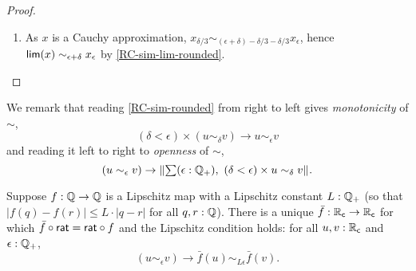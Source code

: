 \begin{proof}
\begin{enumerate}
  \item As $x$ is a Cauchy approximation, $x_{\delta/3} \sim_{(\epsilon + \delta) -
      \delta/3 - \delta/3} x_\epsilon$, hence $\mathsf{lim}(x) \sim_{\epsilon + \delta}
    x_\epsilon$ by \autoref{RC-sim-lim-rounded}.
  \end{enumerate}
\end{proof}

\noindent
We remark that reading \autoref{RC-sim-rounded} from right to left gives
\emph{monotonicity} of $\sim$,
%
\begin{equation*}
  (\delta < \epsilon) \times (u \sim_\delta v) \to u \sim_\epsilon v
\end{equation*}
%
and reading it left to right to \emph{openness} of $\sim$,
%
\begin{equation*}
  (u \sim_\epsilon v) \to \brck{\sm{\epsilon : \Qp} (\delta < \epsilon) \times u \sim_\delta v}.
\end{equation*}



\begin{lem}\label{RC-extend-Q-Lipschitz}
  Suppose $f : \mathbb{Q} \to \mathbb{Q}$ is a Lipschitz map with a Lipschitz constant $L : \mathbb{Q}_{+}$ (so that
  $|f(q) - f(r)| \leq L \cdot |q - r|$ for all $q, r : \mathbb{Q}$). There is a unique $\bar{f} :
  \mathbb{R}_\mathsf{c} \to \mathbb{R}_\mathsf{c}$ for which $\bar{f} \circ \mathsf{rat} = \mathsf{rat} \circ f$ and the Lipschitz
  condition holds: for all $u, v : \mathbb{R}_\mathsf{c}$ and $\epsilon : \mathbb{Q}_{+}$,
  \begin{equation*}
    (u \sim_\epsilon v) \to \bar{f}(u) \sim_{L \epsilon} \bar{f}(v).
  \end{equation*}
\end{lem}

